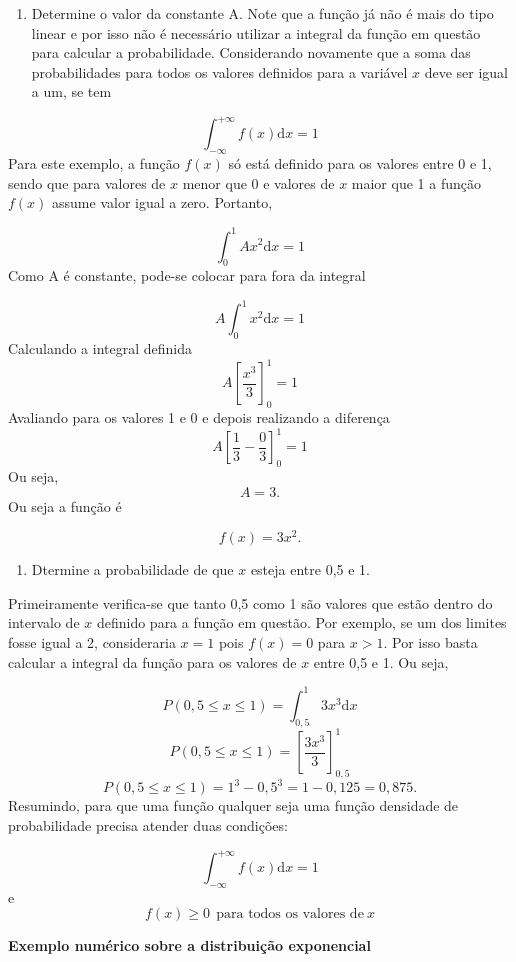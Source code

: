 \documentclass[
]{book}
\providecommand{\tightlist}{%
  \setlength{\itemsep}{0pt}\setlength{\parskip}{0pt}}
\begin{document}
\begin{enumerate}
\def\labelenumi{\alph{enumi})}
\tightlist
\item
  Determine o valor da constante A.
  Note que a função já não é mais do tipo linear e por isso não é necessário utilizar a integral da função em questão para calcular a probabilidade. Considerando novamente que a soma das probabilidades para todos os valores definidos para a variável \(x\) deve ser igual a um, se tem
\end{enumerate}

\[
  \int_{-\infty}^{+\infty} f(x)\text{d}x = 1
\]
Para este exemplo, a função \(f(x)\) só está definido para os valores entre 0 e 1, sendo que para valores de \(x\) menor que 0 e valores de \(x\) maior que 1 a função \(f(x)\) assume valor igual a zero. Portanto,

\[
  \int_{0}^{1} Ax^2\text{d}x = 1
\]
Como A é constante, pode-se colocar para fora da integral

\[
  A\int_{0}^{1} x^2\text{d}x = 1
\]
Calculando a integral definida
\[
  A\left[ \dfrac{x^3}{3} \right]_{0}^{1} = 1
\]
Avaliando para os valores 1 e 0 e depois realizando a diferença
\[
  A\left[ \dfrac{1}{3} - \dfrac{0}{3} \right]_{0}^{1} = 1
\]
Ou seja,
\[
  A = 3.
\]
Ou seja a função é

\[
  f(x) = 3x^2.
\]

\begin{enumerate}
\def\labelenumi{\alph{enumi})}
\setcounter{enumi}{1}
\tightlist
\item
  Dtermine a probabilidade de que \(x\) esteja entre 0,5 e 1.
\end{enumerate}

Primeiramente verifica-se que tanto 0,5 como 1 são valores que estão dentro do intervalo de \(x\) definido para a função em questão. Por exemplo, se um dos limites fosse igual a 2, consideraria \(x=1\) pois \(f(x)=0\) para \(x>1\). Por isso basta calcular a integral da função para os valores de \(x\) entre 0,5 e 1. Ou seja,

\[
  P(0,5\leq x \leq 1) = \int_{0,5}^{1} 3x^3\text{d}x 
\]
\[
  P(0,5\leq x \leq 1) = \left[ \frac{3x^3}{3}  \right]_{0,5}^{1}
\]
\[
  P(0,5\leq x \leq 1) = 1^3 - 0,5^3 = 1 - 0,125 = 0,875.
\]
Resumindo, para que uma função qualquer seja uma função densidade de probabilidade precisa atender duas condições:

\[
  \int_{-\infty}^{+\infty} f(x) \text{d}x = 1
\]
e
\[
  f(x) \geq 0~~\text{para todos os valores de}~x
\]

\textbf{Exemplo numérico sobre a distribuição exponencial}
\end{document}
